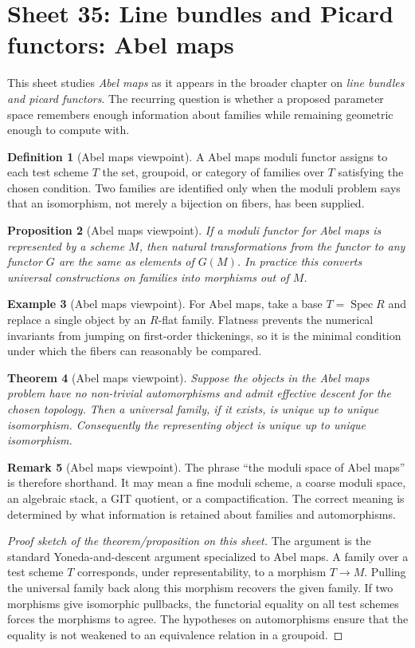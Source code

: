 \documentclass[11pt]{amsart}
\newtheorem{theorem}{Theorem}[section]
\newtheorem{proposition}[theorem]{Proposition}
\theoremstyle{definition}
\newtheorem{definition}[theorem]{Definition}
\newtheorem{example}[theorem]{Example}
\newtheorem{remark}[theorem]{Remark}
\newcommand{\Spec}{\operatorname{Spec}}
\begin{document}
\section{Sheet 35: Line bundles and Picard functors: Abel maps}
This sheet studies \emph{Abel maps} as it appears in the broader chapter on \emph{line bundles and picard functors}.  The recurring question is whether a proposed parameter space remembers enough information about families while remaining geometric enough to compute with.
\begin{definition}[Abel maps viewpoint]
A Abel maps moduli functor assigns to each test scheme $T$ the set, groupoid, or category of families over $T$ satisfying the chosen condition.  Two families are identified only when the moduli problem says that an isomorphism, not merely a bijection on fibers, has been supplied.
\end{definition}
\begin{proposition}[Abel maps viewpoint]
If a moduli functor for Abel maps is represented by a scheme $M$, then natural transformations from the functor to any functor $G$ are the same as elements of $G(M)$.  In practice this converts universal constructions on families into morphisms out of $M$.
\end{proposition}
\begin{example}[Abel maps viewpoint]
For Abel maps, take a base $T=\Spec R$ and replace a single object by an $R$-flat family.  Flatness prevents the numerical invariants from jumping on first-order thickenings, so it is the minimal condition under which the fibers can reasonably be compared.
\end{example}
\begin{theorem}[Abel maps viewpoint]
Suppose the objects in the Abel maps problem have no non-trivial automorphisms and admit effective descent for the chosen topology.  Then a universal family, if it exists, is unique up to unique isomorphism.  Consequently the representing object is unique up to unique isomorphism.
\end{theorem}
\begin{remark}[Abel maps viewpoint]
The phrase ``the moduli space of Abel maps'' is therefore shorthand.  It may mean a fine moduli scheme, a coarse moduli space, an algebraic stack, a GIT quotient, or a compactification.  The correct meaning is determined by what information is retained about families and automorphisms.
\end{remark}
\begin{proof}[Proof sketch of the theorem/proposition on this sheet]
The argument is the standard Yoneda-and-descent argument specialized to Abel maps.  A family over a test scheme $T$ corresponds, under representability, to a morphism $T\to M$.  Pulling the universal family back along this morphism recovers the given family.  If two morphisms give isomorphic pullbacks, the functorial equality on all test schemes forces the morphisms to agree.  The hypotheses on automorphisms ensure that the equality is not weakened to an equivalence relation in a groupoid.
\end{proof}
\end{document}
